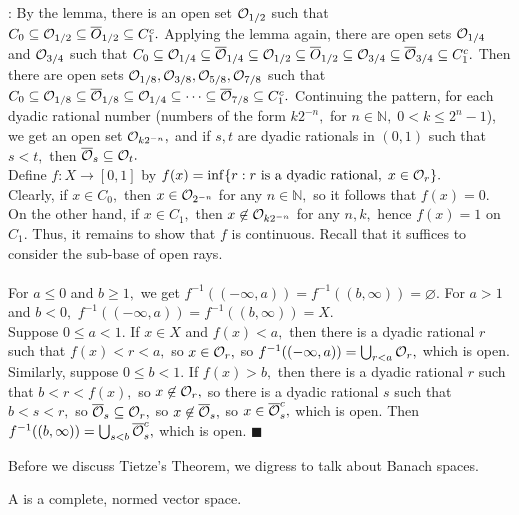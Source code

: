 \begin{frame*}
\noindent {}: By the lemma, there is an open set $\mathcal{O}_{1/2}$ such that \\ $C_0\subseteq \mathcal{O}_{1/2}\subseteq\overline{O}_{1/2}\subseteq C_1^c.$ Applying the lemma again, there are open sets $\mathcal{O}_{1/4}$ and $\mathcal{O}_{3/4}$ such that $C_0\subseteq\mathcal{O}_{1/4}\subseteq\overline{\mathcal{O}}_{1/4}\subseteq\mathcal{O}_{1/2}\subseteq\overline{O}_{1/2}\subseteq\mathcal{O}_{3/4}\subseteq\overline{\mathcal{O}}_{3/4}\subseteq C_1^c.$ 
Then there are open sets $\mathcal{O}_{1/8},\mathcal{O}_{3/8},\mathcal{O}_{5/8},\mathcal{O}_{7/8}$ such that $C_0\subseteq\mathcal{O}_{1/8}\subseteq\overline{\mathcal{O}}_{1/8}\subseteq\mathcal{O}_{1/4}\subseteq\cdots\subseteq\overline{\mathcal{O}}_{7/8}\subseteq C_1^c.$
Continuing the pattern, for each dyadic rational number (numbers of the form $k2^{-n},$ for $n\in\mathbb{N},\; 0<k\leq 2^n-1$), we get an open set $\mathcal{O}_{k2^{-n}},$ and if $s,t$ are dyadic rationals in $(0,1)$ such that $s<t,$ then $\overline{\mathcal{O}}_s\subseteq\mathcal{O}_t.$ \\
Define $f:X\rightarrow[0,1]$ by $f(x)=\inf\{r: r\text{ is a dyadic rational},\; x\in\mathcal{O}_r\}.$ \\
Clearly, if $x\in C_0,$ then $x\in\mathcal{O}_{2^{-n}}$ for any $n\in\mathbb{N},$ so it follows that $f(x)=0.$ On the other hand, if $x\in C_1,$ then $x\not\in \mathcal{O}_{k2^{-n}}$ for any $n,k,$ hence $f(x)=1$ on $C_1.$ Thus, it remains to show that $f$ is continuous. Recall that it suffices to consider the sub-base of open rays. \\ \\ For $a\leq 0$ and $b\geq 1,$ we get $f^{-1}((-\infty,a))=f^{-1}((b,\infty))=\varnothing.$ For $a>1$ and $b<0,$ $f^{-1}((-\infty,a))=f^{-1}((b,\infty))=X.$ \\ Suppose $0\leq a<1.$ If $x\in X$ and $f(x)<a,$ then there is a dyadic rational $r$ such that $f(x)<r<a,$ so $x\in\mathcal{O}_r,$ so $f^{-1}((-\infty,a))=\bigcup_{r<a}\mathcal{O}_r,$ which is open. \\ Similarly, suppose $0\leq b<1.$ If $f(x)>b,$ then there is a dyadic rational $r$ such that $b<r<f(x),$ so $x\not\in\mathcal{O}_r,$ so there is a dyadic rational $s$ such that $b<s<r,$ so $\overline{\mathcal{O}}_s\subseteq\mathcal{O}_r,$ so $x\not\in\overline{\mathcal{O}}_s,$ so $x\in\overline{\mathcal{O}}_s^c,$ which is open. Then $f^{-1}((b,\infty))=\bigcup_{s<b}\overline{\mathcal{O}}_s^c,$ which is open. \;\; $\blacksquare$
\end{frame*}

\noindent Before we discuss Tietze's Theorem, we digress to talk about Banach spaces.
\begin{defn}
A  is a complete, normed vector space.
\end{defn}

